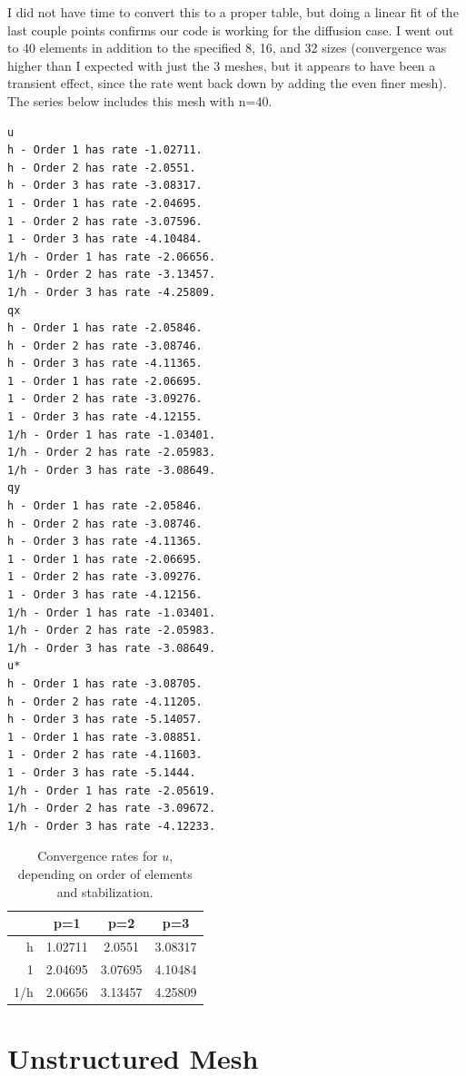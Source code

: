 \documentclass{article}
\begin{document}
I did not have time to convert this to a proper table, but doing a linear fit of the last couple points confirms our code is working for the diffusion case.
I went out to 40 elements in addition to the specified 8, 16, and 32 sizes (convergence was higher than I expected with just the 3 meshes, but it appears to have been a transient effect, since the rate went back down by adding the even finer mesh).
The series below includes this mesh with n=40.
\begin{verbatim}
u
h - Order 1 has rate -1.02711.
h - Order 2 has rate -2.0551.
h - Order 3 has rate -3.08317.
1 - Order 1 has rate -2.04695.
1 - Order 2 has rate -3.07596.
1 - Order 3 has rate -4.10484.
1/h - Order 1 has rate -2.06656.
1/h - Order 2 has rate -3.13457.
1/h - Order 3 has rate -4.25809.
qx
h - Order 1 has rate -2.05846.
h - Order 2 has rate -3.08746.
h - Order 3 has rate -4.11365.
1 - Order 1 has rate -2.06695.
1 - Order 2 has rate -3.09276.
1 - Order 3 has rate -4.12155.
1/h - Order 1 has rate -1.03401.
1/h - Order 2 has rate -2.05983.
1/h - Order 3 has rate -3.08649.
qy
h - Order 1 has rate -2.05846.
h - Order 2 has rate -3.08746.
h - Order 3 has rate -4.11365.
1 - Order 1 has rate -2.06695.
1 - Order 2 has rate -3.09276.
1 - Order 3 has rate -4.12156.
1/h - Order 1 has rate -1.03401.
1/h - Order 2 has rate -2.05983.
1/h - Order 3 has rate -3.08649.
u*
h - Order 1 has rate -3.08705.
h - Order 2 has rate -4.11205.
h - Order 3 has rate -5.14057.
1 - Order 1 has rate -3.08851.
1 - Order 2 has rate -4.11603.
1 - Order 3 has rate -5.1444.
1/h - Order 1 has rate -2.05619.
1/h - Order 2 has rate -3.09672.
1/h - Order 3 has rate -4.12233.
\end{verbatim}

\begin{table}[!ht]
\caption{Convergence rates for $u$, depending on order of elements and stabilization.}
\centering
\begin{tabular}{r | |c c c}
& p=1 & p=2 & p=3 \\
\midrule
h & 1.02711 & 2.0551 & 3.08317 \\
1 & 2.04695 & 3.07695 & 4.10484 \\ 
1/h & 2.06656 & 3.13457 & 4.25809
\end{tabular}
\end{table}

\clearpage

\section{Unstructured Mesh}
\end{document}
